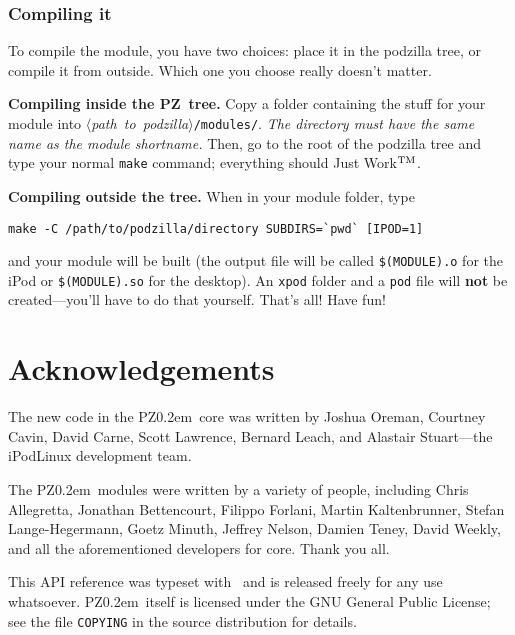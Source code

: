 \documentclass[12pt,letterpaper]{report}
\def\pz{{\footnotesize PZ}}
\def\pzt{\pz\kern0.2em{\large\oldstyle2}}
\let\ttt\tt
\def\tt{\def\_{{\ttt\char`\_}}\ttt}
\def\<#1>{\leavevmode\hbox{$\langle${\sl#1\/}$\rangle$}}
\begin{document}
\subsection{Compiling it}
To compile the module, you have two choices: place it in the podzilla tree, or compile it
from outside. Which one you choose really doesn't matter.

{\bf Compiling inside the \pz\ tree.} Copy a folder containing the stuff for your module
into \<path to podzilla>\verb|/modules/|. {\sl The directory must have the same name
as the module shortname.} Then, go to the root of the podzilla tree and type your normal
\verb|make| command; everything should Just Work$^{\rm TM}$.

{\bf Compiling outside the tree.} When in your module folder, type
\begin{verbatim}
make -C /path/to/podzilla/directory SUBDIRS=`pwd` [IPOD=1]
\end{verbatim}
and your module will be built (the output file will be called {\tt \$(MODULE).o} for the iPod or
{\tt \$(MODULE).so} for the desktop). An {\tt xpod} folder and a {\tt pod} file will {\bf not} be
created---you'll have to do that yourself.
\vskip1cm
{\centering\LARGE\sc That's all! Have fun!}

\chapter{Acknowledgements}
The new code in the \pzt\ core was written by Joshua Oreman, 
Courtney Cavin, David Carne, Scott Lawrence, Bernard Leach, and Alastair Stuart---the
iPodLinux development team.

The \pzt\ modules were written by a variety of people, including
Chris Allegretta,
Jonathan Bettencourt,
Filippo Forlani,
Martin Kaltenbrunner,
Stefan Lange-Hegermann,
Goetz Minuth,
Jeffrey Nelson,
Damien Teney,
David Weekly,
and all the aforementioned developers for core. Thank you all.

This API reference was typeset with \LaTeXe\ and is released freely for any use whatsoever. \pzt\ itself
is licensed under the GNU General Public License; see the file \verb|COPYING| in the source
distribution for details.
\end{document}
